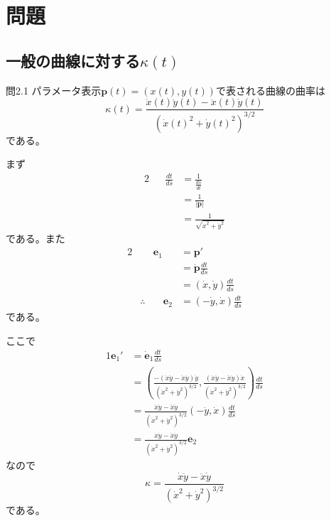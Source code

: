 \documentclass[a4j,disablejfam,dvipdfmx,papersize,slide,uplatex,21pt]{jsarticle}
\makeatletter
\renewenvironment{proof}[1][\proofname]{\par
        \pushQED{\qed}
        \normalfont
        \topsep6\p@\@plus6\p@ \trivlist
        \item[\hskip\labelsep{\bfseries #1}\@addpunct{\bfseries}]\ignorespaces
    }{%
        \popQED\endtrivlist\@endpefalse
    }
\renewcommand{\proofname}{証明.}
\makeatother
\begin{document}
\section{問題}

\newpage
\subsection*{一般の曲線に対する$\kappa(t)$}
\begin{itembox}[l]{問2.1}
    パラメータ表示$\bm{p}(t) = (x(t), y(t))$で表される曲線の曲率は
    \begin{equation}
        \kappa(t) = \frac{\dot{x}(t) \ddot{y}(t) - \ddot{x}(t) \dot{y}(t)}{(\dot{x}(t)^2 + \dot{y}(t)^2)^{3/2}}
    \end{equation}
    である。
\end{itembox}

\newpage
\begin{proof}
    まず
    \begin{alignat}{2}
        && \frac{dt}{ds} &= \frac{1}{\frac{ds}{dt}} \\
            &&&= \frac{1}{|\dot{\bm{p}}|} \\
            &&&= \frac{1}{\sqrt{\dot{x}^2 + \dot{y}^2}}
    \end{alignat}
    である。また
    \begin{alignat}{2}
        &&\bm{e}_1 &= \bm{p}' \\
            &&&= \dot{\bm{p}} \frac{dt}{ds} \\
            &&&= (\dot{x}, \dot{y}) \frac{dt}{ds} \\
        &\therefore& \quad \bm{e}_2 &= (-\dot{y}, \dot{x}) \frac{dt}{ds}
    \end{alignat}
    である。

    \newpage
    ここで
    \begin{alignat}{1}
        \bm{e}_1' &= \dot{\bm{e}}_1 \frac{dt}{ds} \\
            &= \left(
                \frac{-(\dot{x}\ddot{y} - \ddot{x}\dot{y}) \dot{y}}{(\dot{x}^2 + \dot{y}^2)^{3/2}},
                \frac{ (\dot{x}\ddot{y} - \ddot{x}\dot{y}) \dot{x}}{(\dot{x}^2 + \dot{y}^2)^{3/2}}
            \right) \frac{dt}{ds} \\
            &= \frac{\dot{x}\ddot{y} - \ddot{x}\dot{y}}{(\dot{x}^2 + \dot{y}^2)^{3/2}}
            \left(
                -\dot{y},
                 \dot{x}
            \right) \frac{dt}{ds} \\
            &= \frac{\dot{x}\ddot{y} - \ddot{x}\dot{y}}{(\dot{x}^2 + \dot{y}^2)^{3/2}}
                \bm{e}_2
    \end{alignat}
    なので
    \begin{equation}
        \kappa = \frac{\dot{x}\ddot{y} - \ddot{x}\dot{y}}{(\dot{x}^2 + \dot{y}^2)^{3/2}}
    \end{equation}
    である。
\end{proof}
\end{document}
